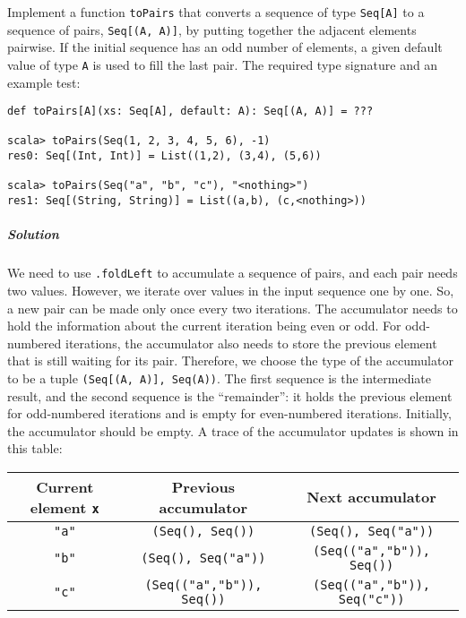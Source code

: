 Implement a function \lstinline!toPairs! that converts a sequence
of type \lstinline!Seq[A]! to a sequence of pairs, \lstinline!Seq[(A, A)]!,
by putting together the adjacent elements pairwise. If the initial
sequence has an odd number of elements, a given default value of type
\lstinline!A! is used to fill the last pair. The required type signature
and an example test:
\begin{lstlisting}
def toPairs[A](xs: Seq[A], default: A): Seq[(A, A)] = ???

scala> toPairs(Seq(1, 2, 3, 4, 5, 6), -1)
res0: Seq[(Int, Int)] = List((1,2), (3,4), (5,6))

scala> toPairs(Seq("a", "b", "c"), "<nothing>")
res1: Seq[(String, String)] = List((a,b), (c,<nothing>)) 
\end{lstlisting}


\subparagraph{Solution}

We need to use \lstinline!.foldLeft! to accumulate a sequence of
pairs, and each pair needs two values. However, we iterate over values
in the input sequence one by one. So, a new pair can be made only
once every two iterations. The accumulator needs to hold the information
about the current iteration being even or odd. For odd-numbered iterations,
the accumulator also needs to store the previous element that is still
waiting for its pair. Therefore, we choose the type of the accumulator
to be a tuple \lstinline!(Seq[(A, A)], Seq(A))!. The first sequence
is the intermediate result, and the second sequence is the ``remainder'':
it holds the previous element for odd-numbered iterations and is empty
for even-numbered iterations. Initially, the accumulator should be
empty. A trace of the accumulator updates is shown in this table:
\begin{center}
\begin{tabular}{|c|c|c|}
\hline 
\textbf{\small{}Current element }\lstinline!x! & \textbf{\small{}Previous accumulator} & \textbf{\small{}Next accumulator}\tabularnewline
\hline 
\hline 
{\small{}}\lstinline!"a"! & {\small{}}\lstinline!(Seq(), Seq())! & {\small{}}\lstinline!(Seq(), Seq("a"))!\tabularnewline
\hline 
{\small{}}\lstinline!"b"! & {\small{}}\lstinline!(Seq(), Seq("a"))! & {\small{}}\lstinline!(Seq(("a","b")), Seq())!\tabularnewline
\hline 
{\small{}}\lstinline!"c"! & {\small{}}\lstinline!(Seq(("a","b")), Seq())! & {\small{}}\lstinline!(Seq(("a","b")), Seq("c"))!\tabularnewline
\hline 
\end{tabular}
\par\end{center}

